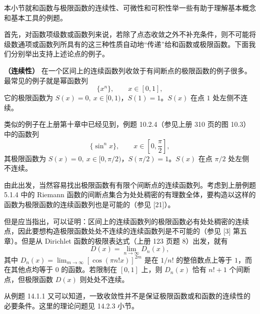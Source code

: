 本小节就和函数与极限函数的连续性、可微性和可积性举一些有助于理解基本概念和基本工具的例题。

首先，对函数项级数或函数列来说，若除了点态收敛之外不补充条件，则不可能将级数通项或函数列所具有的这三种性质自动地“传递”给和函数或极限函数。下面我们分别举出支持上述论点的例子。

\begin{xexample}[14.2.1]
\textbf{（连续性）} 在一个区间上的连续函数列收敛于有间断点的极限函数的例子很多。最常见的例子就是幂函数列
\[
  \{x^n\},\qquad x\in[0,1],
\]
它的极限函数为 $S(x)=0,\ x\in[0,1)$，$S(1)=1$。$S(x)$ 在点 $1$ 处左侧不连续。

类似的例子在上册第十章中已经见到，例题 10.2.4（参见上册 310 页的图 10.3）中的函数列
\[
  \{\sin^n x\},\qquad x\in\left[0,\frac\pi2\right],
\]
其极限函数为 $S(x)=0,\ x\in[0,\pi/2)$，$S(\pi/2)=1$。$S(x)$ 在点 $\pi/2$ 处左侧不连续。

由此出发，当然容易找出极限函数有有限个间断点的连续函数列。考虑到上册例题 5.1.4 中的 Riemann 函数的间断点集合为处处稠密的有理数全体，要构造以这样的函数为极限函数的连续函数列也是可能的（参见 [21]）。

但是应当指出，可以证明：区间上的连续函数列的极限函数必有处处稠密的连续点，因此要想构造极限函数处处不连续的连续函数列是不可能的（参见 [3] 第五章）。但是从 Dirichlet 函数的极限表达式（上册 123 页题 8）出发，就有
\begin{equation}
  D(x)=\lim_{n\to\infty}D_n(x),
  \tag{14.6}
  \label{eq:14.6}
\end{equation}
其中 $D_n(x)=\displaystyle\lim_{m\to\infty}[\cos(\pi n!x)]^{2m}$ 是在 $1/n!$ 的整倍数点上等于 $1$，而在其他点均等于 $0$ 的函数。若限制在 $[0,1]$ 上，则 $D_n(x)$ 恰有 $n!+1$ 个间断点，但极限函数 $D(x)$ 则处处不连续。

从例题 14.1.1 又可以知道，一致收敛性并不是保证极限函数或和函数的连续性的必要条件。这里的理论问题见 14.2.3 小节。
\end{xexample}

